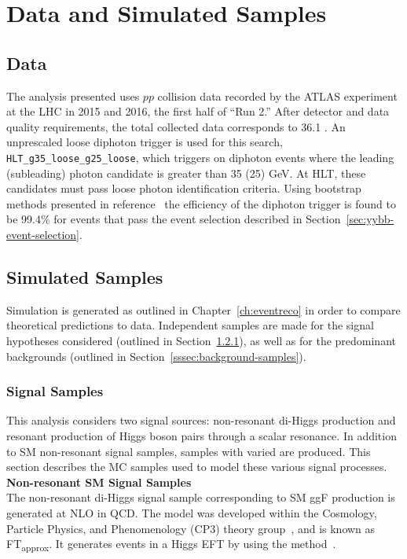\section{Data and Simulated Samples}


\subsection{Data}

The analysis presented uses $pp$ collision data recorded by the ATLAS experiment at the LHC in 2015 and 2016, the first half of ``Run 2.'' After detector and data quality requirements, the total collected data corresponds to 36.1 \ifb. An unprescaled loose diphoton trigger is used for this search, \texttt{HLT\_g35\_loose\_g25\_loose}, which triggers on diphoton events where the leading (subleading) photon candidate \pt is greater than 35 (25) GeV. At \gls{HLT}, these candidates must pass loose photon identification criteria. Using bootstrap methods presented in reference~\cite{trigger-unc} the efficiency of the diphoton trigger is found to be 99.4\% for events that pass the event selection described in Section~\ref{sec:yybb-event-selection}.

\subsection{Simulated Samples}

Simulation is generated as outlined in Chapter~\ref{ch:eventreco} in order to compare theoretical predictions to data. Independent samples are made for the signal hypotheses considered (outlined in Section~\ref{sssec:signal-samples}), as well as for the predominant backgrounds (outlined in Section~\ref{sssec:background-samples}).

\subsubsection{Signal Samples}\label{sssec:signal-samples}

This analysis considers two signal sources: non-resonant di-Higgs production and resonant production of Higgs boson pairs through a scalar resonance. In addition to \gls{SM} non-resonant signal samples, samples with varied \klambda are produced. This section describes the \gls{MC} samples used to model these various signal processes.\\

\noindent\textbf{Non-resonant \gls{SM} Signal Samples}\\
\indent The non-resonant di-Higgs signal sample corresponding to \gls{SM} \gls{ggF} \hh production is generated at \gls{NLO} in \gls{QCD}. The model was developed within the Cosmology, Particle Physics, and Phenomenology (CP3) theory group~\cite{top-quark-massrw}, and is known as FT\textsubscript{approx}. It generates events in a Higgs \gls{EFT} by using the \AMCatNLO method~\cite{amc-at-nlo}.

